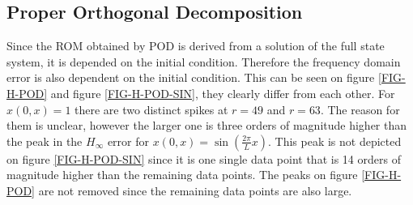 \subsection{Proper Orthogonal Decomposition}
Since the ROM obtained by POD is derived from a solution of the full state system, it is depended on the initial condition.
Therefore the frequency domain error is also dependent on the initial condition.
This can be seen on figure \ref{FIG-H-POD} and figure \ref{FIG-H-POD-SIN}, they clearly differ from each other.
For \(x(0, x) = 1\) there are two distinct spikes at \(r=49\) and \(r=63\).
The reason for them is unclear, however the larger one is three orders of magnitude higher than the peak in the \(H_{\infty}\) error for $x(0, x) =  \sin(\frac{2\pi}{L}x)$.
This peak is not depicted on figure \ref{FIG-H-POD-SIN} since it is one single data point that is 14 orders of magnitude higher than the remaining data points.
The peaks on figure \ref{FIG-H-POD} are not removed since the remaining data points are also large.
